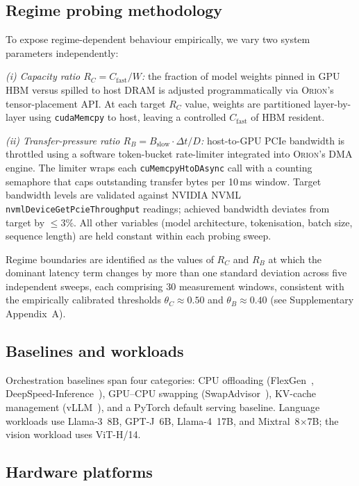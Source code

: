 \subsection*{Regime probing methodology}

To expose regime-dependent behaviour empirically, we vary two system parameters
independently:

\textit{(i) Capacity ratio $R_C = C_{\mathrm{fast}}/W$:} the fraction of model
weights pinned in GPU HBM versus spilled to host DRAM is adjusted
programmatically via \textsc{Orion}'s tensor-placement API.
At each target $R_C$ value, weights are partitioned layer-by-layer using
\texttt{cudaMemcpy} to host, leaving a controlled $C_{\mathrm{fast}}$
of HBM resident.

\textit{(ii) Transfer-pressure ratio $R_B = B_{\mathrm{slow}} \cdot \Delta t / D$:}
host-to-GPU PCIe bandwidth is throttled using a software token-bucket
rate-limiter integrated into \textsc{Orion}'s DMA engine.
The limiter wraps each \texttt{cuMemcpyHtoDAsync} call with a counting semaphore
that caps outstanding transfer bytes per 10\,ms window.
Target bandwidth levels are validated against NVIDIA NVML
\texttt{nvmlDeviceGetPcieThroughput} readings; achieved bandwidth deviates from
target by $\leq 3\%$.
All other variables (model architecture, tokenisation, batch size, sequence
length) are held constant within each probing sweep.

Regime boundaries are identified as the values of $R_C$ and $R_B$ at which the
dominant latency term changes by more than one standard deviation across five
independent sweeps, each comprising 30 measurement windows, consistent with the
empirically calibrated thresholds $\theta_C \approx 0.50$ and
$\theta_B \approx 0.40$ (see Supplementary Appendix~A).

\subsection*{Baselines and workloads}

Orchestration baselines span four categories: CPU offloading
(FlexGen~\cite{flexgen2023}, DeepSpeed-Inference~\cite{aminabadi2022deepspeedinference}),
GPU--CPU swapping (SwapAdvisor~\cite{huang2020swapadvisor}),
KV-cache management (vLLM~\cite{kwon2023pagedattention}),
and a PyTorch default serving baseline.
Language workloads use Llama-3~8B, GPT-J~6B, Llama-4~17B, and
Mixtral~8$\times$7B; the vision workload uses ViT-H/14.

\subsection*{Hardware platforms}

